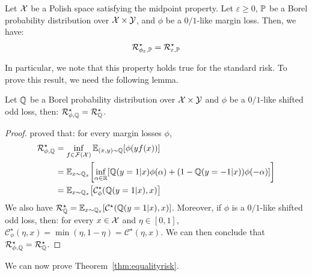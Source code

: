 \begin{thm}


\label{thm:equalityrisk}
Let $\mathcal{X}$ be a Polish space satisfying the midpoint property. Let $\varepsilon\geq 0$, $\mathbb{P}$ be a Borel probability distribution over $\mathcal{X}\times\mathcal{Y}$, and ${\phi}$ be a $0/1$-like margin loss. Then, we have:
\begin{align*}
\mathcal{R}^\star_{{\phi}_\varepsilon,\mathbb{P}} = \mathcal{R}^\star_{\varepsilon,\mathbb{P}}
\end{align*}
\end{thm}

In particular, we note that this property holds true for the standard risk. To prove this result, we need the following lemma.


\begin{lemma}
    \label{lem:equalityriskstandard}
    Let $\mathbb{Q}$ be a Borel probability distribution over $\mathcal{X}\times\mathcal{Y}$ and ${\phi}$ be a $0/1$-like shifted odd loss, then: $\mathcal{R}_{\phi,\mathbb{Q}}^\star =\mathcal{R}_{\mathbb{Q}}^\star$.
    \end{lemma}
    
    \begin{proof}
    \citet{bartlett2006convexity,steinwart2007compare} proved that: for every margin losses $\phi$,
    \begin{align*}
        \risk_{\phi,\QQ}^\star &= \inf_{f\in\mathcal{F}(\XX)}\mathbb{E}_{(x,y)\sim\QQ}\left[\phi(yf(x))\right] 
        \\&= \mathbb{E}_{x\sim\QQ_x}\left[\inf_{\alpha\in\RR}\left[\QQ(y=1|x)\phi(\alpha)+(1-\QQ(y=-1|x))\phi(-\alpha)\right]\right]\\
        &= \mathbb{E}_{x\sim\QQ_x}\left[\mathcal{C}_\phi^\star(\QQ(y=1|x),x)\right]\\
    \end{align*}
    We also have $ \risk_{\QQ}^\star =\mathbb{E}_{x\sim\QQ_x}\left[\mathcal{C}^\star(\QQ(y=1|x),x)\right] $. Moreover, if $\phi$ is a $0/1$-like shifted odd loss, then: for every $x\in\mathcal{X}$ and $\eta\in[0,1]$, $\mathcal{C}_\phi^\star(\eta,x) =\min(\eta,1-\eta)=\mathcal{C}^\star(\eta,x)$. We can then conclude that  $\mathcal{R}_{\phi,\mathbb{Q}}^\star =\mathcal{R}_{\mathbb{Q}}^\star$.
    \end{proof}
    
    We can now prove Theorem~\ref{thm:equalityrisk}.
    

